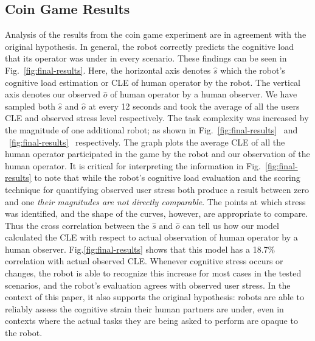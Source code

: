 \documentclass{sig-alternate}
\begin{document}

\subsection{Coin Game Results}

Analysis of the results from the coin game experiment are in agreement
with the original hypothesis. In general, the robot correctly predicts
the cognitive load that its operator was under in every
scenario. These findings can be seen in Fig.~\ref{fig:final-results}.
Here, the horizontal axis denotes $\hat{s}$ which the robot's cognitive load estimation or CLE of human operator by the robot. The vertical axis denotes our observed $\hat{o}$ of human operator by a human observer. We have sampled both $\hat{s}$ and $\hat{o}$ at every 12 seconds and took the average of all the users CLE and observed stress level respectively. The task complexity was increased by the magnitude of one additional robot; as shown in Fig.~\ref{fig:final-results}~ and ~\ref{fig:final-results}~ respectively. The graph plots the average CLE of all the human operator participated in the game by the robot and our observation of the human operator. It is critical for interpreting the
information in Fig.~\ref{fig:final-results} to note that while the robot's
cognitive load evaluation and the scoring technique for quantifying
observed user stress both produce a result between zero and one
\textit{their magnitudes are not directly comparable}. The points at
which stress was identified, and the shape of the curves, however, are
appropriate to compare. Thus the cross correlation between the $\hat{s}$ and $\hat{o}$ can tell us how our model calculated the CLE with respect to actual observation of human operator by a human observer. Fig.\ref{fig:final-results} shows that this model has a 18.7\% correlation with actual observed CLE. Whenever cognitive stress occurs or changes,
the robot is able to recognize this increase for most cases in the
tested scenarios, and the robot's evaluation agrees with observed
user stress.  In the context of this paper, it also supports the
original hypothesis: robots are able to reliably assess the
cognitive strain their human partners are under, even in contexts
where the actual tasks they are being asked to perform are opaque to
the robot.
\end{document}
